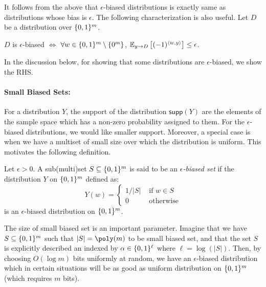 It follows from the above that $\epsilon$-biased distributions is exactly same as distributions whose bias is $\epsilon$. The following characterization is also useful. Let $D$ be a distribution over $\{0,1\}^m$.
\begin{proposition}
\label{prop:epsilon-biasd-expectation}
$D$ is $\epsilon$-biased $\iff$ $\forall w \in \{0,1\}^m \setminus \{0^m\}$, ${\mathbb E}_{y \to D} \left[ (-1)^{\langle w,y \rangle} \right] \le \epsilon$.
\end{proposition}
In the discussion below, for showing that some distributions are $\epsilon$-biased, we show the RHS.


\paragraph{Small Biased Sets:} For a distribution $Y$, the support of the distribution $\mathsf{supp}(Y)$ are the elements of the sample space which has a non-zero probability assigned to them. For the $\epsilon$-biased distributions, we would like smaller support. Moreover, a special case is when we have a multiset of small size over which the distribution is uniform. This motivates the following definition.

\begin{definition}
Let $\epsilon > 0$.
A sub(multi)set $S \subseteq \{0,1\}^m$ is said to be an \textit{$\epsilon$-biased set} if the distribution $Y$ on $\{0,1\}^m$ defined as:
\[
Y(w) = \left\{
\begin{array}{ll}
1/|S| & \textrm{ if $w \in S$} \\
0 & \textrm{ otherwise}
\end{array}
\right.
\]
is an $\epsilon$-biased distribution on $\{0,1\}^m$.
\end{definition}

\noindent The size of small biased set is an important parameter. Imagine that we have $S \subseteq \{0,1\}^m$ such that $|S| = \poly(m)$ to be small biased set, and that the set $S$ is explicitly described an indexed by $\alpha \in \{0,1\}^\ell$ where $\ell = \log(|S|)$. Then, by choosing $O(\log m)$ bits uniformly at random, we have an $\epsilon$-biased distribution  which in certain situations will be as good as uniform distribution on $\{0,1\}^m$ (which requires $m$ bits).

